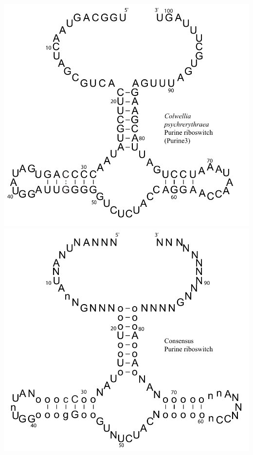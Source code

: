 \includegraphics[scale=0.5]{Figures/purine3_full}
\includegraphics[scale=0.5]{Figures/purineC_full}



